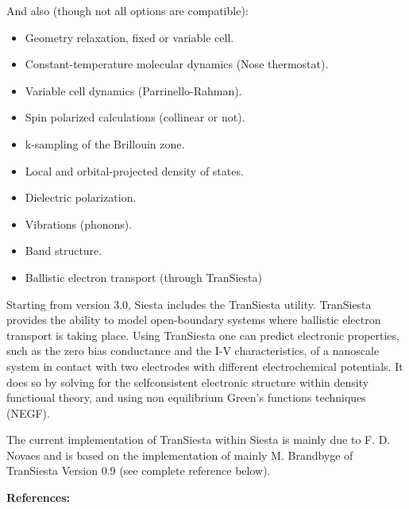 \documentclass[11pt]{article}
\begin{document}
And also (though not all options are compatible):
\begin{itemize}
\item Geometry relaxation, fixed or variable cell.
\item Constant-temperature molecular dynamics (Nose thermostat).
\item Variable cell dynamics (Parrinello-Rahman).
\item Spin polarized calculations (collinear or not).
\item k-sampling of the Brillouin zone.
\item Local and orbital-projected density of states.
\item Dielectric polarization.
\item Vibrations (phonons).
\item Band structure.
\item Ballistic electron transport (through {\sc TranSiesta})
\end{itemize}


Starting from version 3.0, {\sc Siesta} includes the 
{\sc TranSiesta} utility. 
{\sc TranSiesta} provides the ability to model open-boundary systems 
where ballistic electron transport is taking place.
Using {\sc TranSiesta} one can predict electronic properties,
such as the zero bias conductance and the I-V characteristics, 
of a nanoscale system in contact with two electrodes with different 
electrochemical potentials. 
It does so by solving for the selfconsistent electronic structure within 
density functioual theory, and using non equilibrium Green's functions 
techniques (NEGF).

The current implementation of {\sc TranSiesta} within {\sc Siesta} is mainly 
due to F. D. Novaes and is based on the implementation of 
mainly M. Brandbyge of {\sc TranSiesta} Version 0.9 (see 
complete reference below). 


\vspace{0.5cm}
{\large {\bf References:} }
\end{document}
